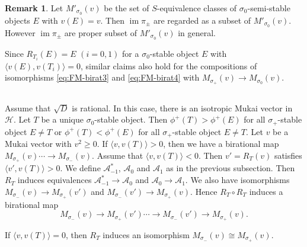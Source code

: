 \documentclass[leqno,11pt]{amsart}
\def\im{\mathop{\mathrm{im}}\nolimits}
\theoremstyle{definition}
\newtheorem{Rem}[Thm]{Remark}
\def\AA{\ensuremath{\mathcal A}}
\def\HH{\ensuremath{\mathcal H}}
\begin{document}
\begin{Rem}
Let $M'_{\sigma_0}(v)$ be the set of 
$S$-equivalence classes
of $\sigma_0$-semi-stable objects $E$ with $v(E)=v$.
Then $\im \pi_\pm$ are regarded as a subset of $M'_{\sigma_0}(v)$.
However $\im \pi_\pm$ are proper subset of $M'_{\sigma_0}(v)$
in general. 
\end{Rem}




Since $R_{T_i}(E)=E$ $(i=0,1)$ for a $\sigma_0$-stable object $E$ with 
$\langle v(E),v(T_i) \rangle=0$,
similar claims also hold for the compositions of isomorphisms 
\eqref{eq:FM-birat3} and \eqref{eq:FM-birat4} with $M_{\sigma_+}(v) \to 
M_{\sigma_0}(v)$.






\subsection{}

Assume that $\sqrt{D}$ is rational.
In this case, there is an isotropic Mukai vector in $\HH$.
Let $T$ be a unique $\sigma_0$-stable object. Then 
$\phi^+(T) >\phi^+(E)$ for all $\sigma_+$-stable object $E \ne T$
or      
$\phi^+(T) <\phi^+(E)$ for all $\sigma_+$-stable object $E \ne T$.
Let $v$ be a Mukai vector with $v^2\geq 0$.
If $\langle v,v(T) \rangle >0$,
then we have a birational map 
$M_{\sigma_+}(v) \cdots \to M_{\sigma_-}(v)$.
Assume that $\langle v,v(T) \rangle <0$.
Then $v'=R_{T}(v)$ satisfies 
$\langle v',v(T) \rangle >0$.  
We define $\AA_{-1}^*$, $\AA_0$ and $\AA_1$
as in the previous subsection.
Then $R_T$ induces equivalences $\AA_{-1}^* \to \AA_0$ and
$\AA_0 \to \AA_1$.
We also have isomorphisms 
$M_{\sigma_-}(v) \to M_{\sigma_+}(v')$ and
$M_{\sigma_-}(v') \to M_{\sigma_+}(v)$. 
Hence $R_T \circ R_T$ induces a birational map
\begin{equation}
M_{\sigma_-}(v) \to M_{\sigma_+}(v') \cdots 
\to M_{\sigma_-}(v') \to M_{\sigma_+}(v).
\end{equation}

If $\langle v, v(T) \rangle=0$, then 
$R_T$ induces an isomorphism
$M_{\sigma_-}(v) \cong M_{\sigma_+}(v)$.
\end{document}
